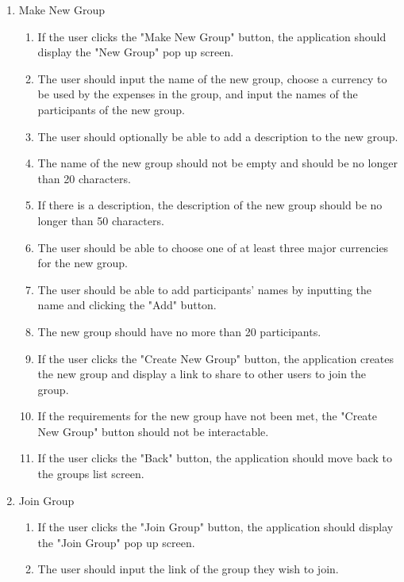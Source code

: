\documentclass[conference]{IEEEtran}
\begin{document}
\begin{enumerate}
\begin{enumerate}
\begin{enumerate}
                    \end{enumerate}
                \item Make New Group
                    \begin{enumerate}
                        \item If the user clicks the "Make New Group" button, the application should display the "New Group" pop up screen.
                        \item The user should input the name of the new group, choose a currency to be used by the expenses in the group, and input the names of the participants of the new group.
                        \item The user should optionally be able to add a description to the new group.
                        \item The name of the new group should not be empty and should be no longer than 20 characters.
                        \item If there is a description, the description of the new group should be no longer than 50 characters.
                        \item The user should be able to choose one of at least three major currencies for the new group.
                        \item The user should be able to add participants' names by inputting the name and clicking the "Add" button.
                        \item The new group should have no more than 20 participants.
                        \item If the user clicks the "Create New Group" button, the application creates the new group and display a link to share to other users to join the group.
                        \item If the requirements for the new group have not been met, the "Create New Group" button should not be interactable.
                        \item If the user clicks the "Back" button, the application should move back to the groups list screen.
                    \end{enumerate}
                \item Join Group
                    \begin{enumerate}
                        \item If the user clicks the "Join Group" button, the application should display the "Join Group" pop up screen.
                        \item The user should input the link of the group they wish to join.

\end{enumerate}
\end{enumerate}
\end{enumerate}
\end{document}
